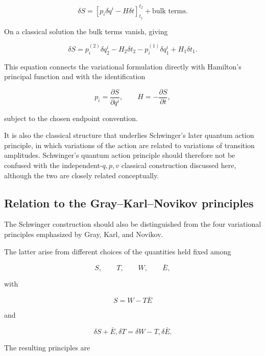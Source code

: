 \begin{equation}
\delta S=\left[
p_i\delta q^i-H\delta t
\right]_{t_1}^{t_2}
+
\text{bulk terms}.
\end{equation}

On a classical solution the bulk terms vanish, giving

\begin{equation}
\boxed{
\delta S=p_i^{(2)}\delta q_2^i
-H_2\delta t_2-
p_i^{(1)}\delta q_1^i
+H_1\delta t_1.
}
\label{eq:EndpointSchwinger}
\end{equation}

This equation connects the variational formulation directly with Hamilton's principal function and with the identification

\begin{equation}
p_i=\frac{\partial S}{\partial q^i},
\qquad
H=-\frac{\partial S}{\partial t},
\end{equation}

subject to the chosen endpoint convention.

It is also the classical structure that underlies Schwinger's later quantum action principle, in which variations of the action are related to variations of transition amplitudes. Schwinger's quantum action principle should therefore not be confused with the independent-\(q,p,v\) classical construction discussed here, although the two are closely related conceptually.

\subsection{Relation to the Gray--Karl--Novikov principles}

The Schwinger construction should also be distinguished from the four variational principles emphasized by Gray, Karl, and Novikov.

The latter arise from different choices of the quantities held fixed among

$$ S,\qquad T,\qquad W,\qquad \bar E,$$

with

\begin{equation}
S=W-T\bar E
\end{equation}

and

\begin{equation}
\delta S+\bar E,\delta T=\delta W-T,\delta\bar E.
\end{equation}

The resulting principles are

